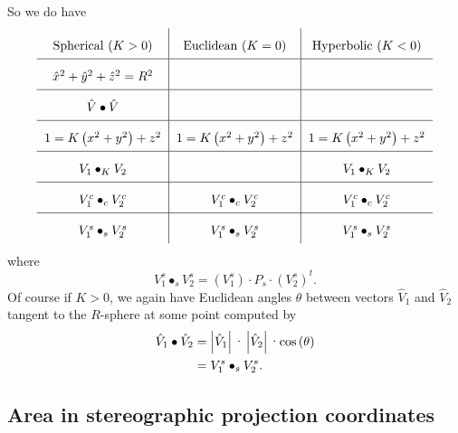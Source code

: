 \documentclass{ximera}
\begin{document}
So we do have%
\[%
{\renewcommand{\arraystretch}{2}
\begin{tabular}
[c]{c|c|c}%
Spherical ($K>0$) & Euclidean ($K=0$) & Hyperbolic ($K<0$)\\\hline
$\hat{x}^{2}+\hat{y}^{2}+\hat{z}^{2}=R^{2}$ &  & \\\hline
$\hat{V}\bullet\hat{V}$ &  & \\\hline
$1=K\left(  x^{2}+y^{2}\right)  +z^{2}$ & $1=K\left(  x^{2}+y^{2}\right)
+z^{2}$ & $1=K\left(  x^{2}+y^{2}\right)  +z^{2}$\\\hline
$V_{1}\bullet_{K}V_{2}$ &  & $V_{1}\bullet_{K}V_{2}$\\\hline
$V_{1}^{c}\bullet_{c}V_{2}^{c}$ & $V_{1}^{c}\bullet_{c}V_{2}^{c}$ & $V_{1}%
^{c}\bullet_{c}V_{2}^{c}$\\\hline
$V_{1}^{s}\bullet_{s}V_{2}^{s}$ & $V_{1}^{s}\bullet_{s}V_{2}^{s}$ & $V_{1}%
^{s}\bullet_{s}V_{2}^{s}$%
\end{tabular}}
\]
where%
\[
V_{1}^{s}\bullet_{s}V_{2}^{s}=\left(  V_{1}^{s}\right)  \cdot P_{s}%
\cdot\left(  V_{2}^{s}\right)  ^{t}.
\]
Of course if $K>0$, we again have Euclidean angles $\theta$ between vectors
$\hat{V}_{1}$ and $\hat{V}_{2}$ tangent to the $R$-sphere at some point
computed by%
\begin{align*}
\hat{V}_{1}\bullet\hat{V}_{2}  &  =\left\vert \hat{V}_{1}\right\vert
\text{\textperiodcentered}\left\vert \hat{V}_{2}\right\vert
\text{\textperiodcentered\textrm{cos}}\left(  \theta\right) \\
&  =V_{1}^{s}\bullet_{s}V_{2}^{s}.
\end{align*}


\subsection*{Area in stereographic projection coordinates}
\end{document}
